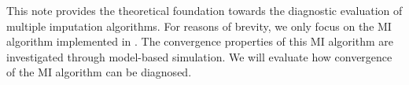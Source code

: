 \documentclass[article]{jss}
\begin{document}
This note provides the theoretical foundation towards the diagnostic evaluation of %
multiple imputation algorithms. For reasons of brevity, we only focus on the MI algorithm implemented in  \citep{mice}. 
The convergence properties of this MI algorithm are investigated through model-based simulation\footnotemark.%
We will evaluate how convergence of the MI algorithm can be diagnosed.



 


\end{document}
